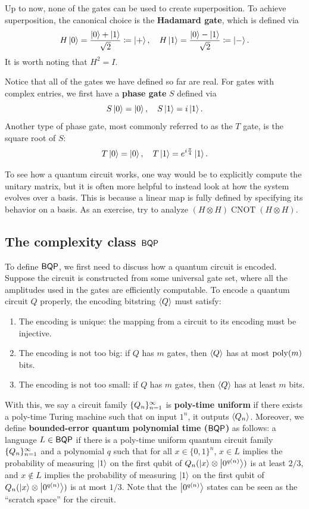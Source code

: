 \documentclass[a4paper,draft]{article}
\begin{document}
Up to now, none of the gates can be used to create superposition. To
achieve superposition, the canonical choice is the \textbf{Hadamard gate},
which is defined via
\[
  H \left\lvert 0\right\rangle = \frac{\left\lvert 0\right\rangle + \left\lvert 1\right\rangle}{\sqrt{2}} \coloneq \left\lvert +\right\rangle,
  \quad
  H \left\lvert 1\right\rangle = \frac{\left\lvert 0\right\rangle - \left\lvert 1\right\rangle}{\sqrt{2}} \coloneq \left\lvert -\right\rangle.
\]
It is worth noting that $H^2 = I$.

Notice that all of the gates we have defined so far are real. For gates
with complex entries, we first have a \textbf{phase gate} $S$ defined via
\[
  S \left\lvert 0\right\rangle = \left\lvert 0\right\rangle,
  \quad
  S \left\lvert 1\right\rangle = i \left\lvert 1\right\rangle.
\]
Another type of phase gate, most commonly referred to as the $T$ gate,
  is the square root of $S$:
\[
  T \left\lvert 0\right\rangle = \left\lvert 0\right\rangle,
  \quad
  T \left\lvert 1\right\rangle = e^{i \frac{\pi}{4}} \left\lvert 1\right\rangle.
\]

To see how a quantum circuit works, one way would be to explicitly compute
the unitary matrix, but it is often more helpful to instead look at how
the system evolves over a basis. This is because a linear map is fully
defined by specifying its behavior on a basis. As an exercise, try to
analyze $(H \otimes H) \operatorname{CNOT} (H \otimes H)$.

\subsection{The complexity class $\operatorname{\mathsf{BQP}}$}

To define $\operatorname{\mathsf{BQP}}$, we first need to discuss how a quantum circuit is
encoded. Suppose the circuit is constructed from some universal gate set,
where all the amplitudes used in the gates are efficiently computable. To
encode a quantum circuit $Q$ properly, the encoding bitstring $\left\langle Q
\right\rangle$ must satisfy:
\begin{enumerate}
  \item The encoding is unique: the mapping from a circuit to its encoding
        must be injective.
  \item The encoding is not too big: if $Q$ has $m$ gates, then $\left\langle Q
        \right\rangle$ has at most $\operatorname{poly}(m)$ bits.
  \item The encoding is not too small: if $Q$ has $m$ gates, then $\left\langle Q
        \right\rangle$ has at least $m$ bits.
\end{enumerate}

With this, we say a circuit family $\{ Q_n \}_{n=1}^\infty$ is \textbf{poly-time
uniform} if there exists a poly-time Turing machine such that on input
$1^n$, it outputs $\left\langle Q_n \right\rangle$. Moreover, we define
\textbf{bounded-error quantum polynomial time ($\operatorname{\mathsf{BQP}}$)} as follows: a
language $L \in \operatorname{\mathsf{BQP}}$ if there is a poly-time uniform quantum circuit
family $\{ Q_n \}_{n=1}^\infty$ and a polynomial $q$ such that for all $x \in \{0,
1\}^n$, $x \in L$ implies the probability of measuring $\left\lvert 1\right\rangle$ on the
first qubit of $Q_n (\left\lvert x\right\rangle \otimes \left\lvert 0^{q(n)}\right\rangle)$ is at least $2/3$,
and $x \notin L$ implies the probability of measuring $\left\lvert 1\right\rangle$ on the
first qubit of $Q_n (\left\lvert x\right\rangle \otimes \left\lvert 0^{q(n)}\right\rangle)$ is at most $1/3$.
Note that the $\left\lvert 0^{q(n)}\right\rangle$ states can be seen as the ``scratch
space'' for the circuit.
\end{document}
